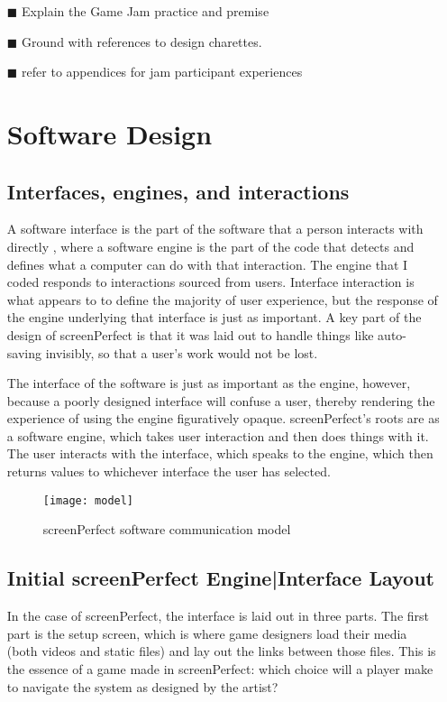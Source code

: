 \begin{itemize}
\item[\tiny{$\blacksquare$}] Explain the Game Jam practice and premise
\item[\tiny{$\blacksquare$}] Ground with references to design charettes.
\item[\tiny{$\blacksquare$}] refer to appendices for jam participant experiences




\section{Software Design}
\subsection{Interfaces, engines, and interactions}

A software interface is the part of the software that a person interacts with directly \cite{interactiondestext}, where a software engine is the part of the code that detects and defines what a computer can do with that interaction. The engine that I coded responds to interactions sourced from users. Interface interaction is what appears to to define the majority of user experience, but the response of the engine underlying that interface is just as important. A key part of the design of screenPerfect is that it was laid out to handle things like auto-saving invisibly, so that a user's work would not be lost.

The interface of the software is just as important as the engine, however, because a poorly designed interface will confuse a user, thereby rendering the experience of using the engine figuratively opaque. screenPerfect's roots are as a software engine, which takes user interaction and then does things with it. The user interacts with the interface, which speaks to the engine, which then returns values to whichever interface the user has selected.

\begin{figure}[h]
  \caption{screenPerfect software communication model}
  \centering
    \texttt{[image: model]}
\end{figure}


\subsection{Initial screenPerfect Engine|Interface Layout}
In the case of screenPerfect, the interface is laid out in three parts. The first part is the setup screen, which is where game designers load their media (both videos and static files) and lay out the links between those files. This is the essence of a game made in screenPerfect: which choice will a player make to navigate the system as designed by the artist?


\end{itemize}
